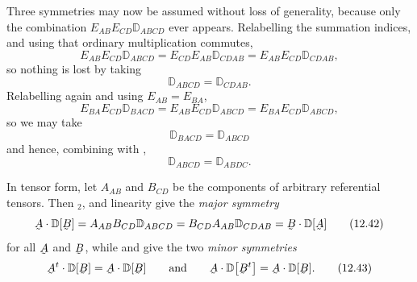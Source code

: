 Three symmetries may now be assumed without loss of generality, because
only the combination $E_{AB}E_{CD}\mathbb{D}_{ABCD}$ ever appears.
Relabelling the summation indices, and using that ordinary
multiplication commutes,
\begin{equation}
   E_{AB}E_{CD}\mathbb{D}_{ABCD}=E_{CD}E_{AB}\mathbb{D}_{CDAB}
   =E_{AB}E_{CD}\mathbb{D}_{CDAB},
   \tag{12.37}\label{eq:12.37}
\end{equation}
so nothing is lost by taking
\begin{equation}
   \mathbb{D}_{ABCD}=\mathbb{D}_{CDAB} .
   \tag{12.38}\label{eq:12.38}
\end{equation}
Relabelling again and using $E_{AB}=E_{BA}$,
\begin{equation}
   E_{BA}E_{CD}\mathbb{D}_{BACD}=E_{AB}E_{CD}\mathbb{D}_{ABCD}
   =E_{BA}E_{CD}\mathbb{D}_{ABCD},
   \tag{12.39}\label{eq:12.39}
\end{equation}
so we may take
\begin{equation}
   \mathbb{D}_{BACD}=\mathbb{D}_{ABCD}
   \tag{12.40}\label{eq:12.40}
\end{equation}
and hence, combining with ,
\begin{equation}
   \mathbb{D}_{ABCD}=\mathbb{D}_{ABDC} .
   \tag{12.41}\label{eq:12.41}
\end{equation}

In tensor form, let $A_{AB}$ and $B_{CD}$ be the components of arbitrary
referential tensors. Then $_{2}$,  and linearity
give the \emph{major symmetry}
\begin{equation}
   \bA\cdot\mathbb{D}[\bB]=A_{AB}B_{CD}\mathbb{D}_{ABCD}
   =B_{CD}A_{AB}\mathbb{D}_{CDAB}=\bB\cdot\mathbb{D}[\bA]
   \tag{12.42}\label{eq:12.42}
\end{equation}
for all $\bA$ and $\bB$, while  and  give the two
\emph{minor symmetries}
\begin{equation}
   \bA^{t}\cdot\mathbb{D}[\bB]=\bA\cdot\mathbb{D}[\bB]
   \qquad\text{and}\qquad
   \bA\cdot\mathbb{D}\big[\bB^{t}\big]=\bA\cdot\mathbb{D}[\bB].
   \tag{12.43}\label{eq:12.43}
\end{equation}

